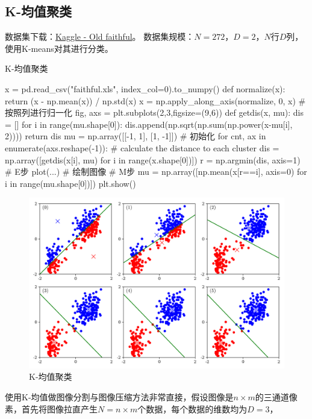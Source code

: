 \documentclass[12pt, a4paper, oneside]{ctexart}
\begin{document}
\subsection{K-均值聚类}
数据集下载：\href{https://www.kaggle.com/code/niteshhalai/old-faithful-data-visualisation-and-modelling/input}{Kaggle - Old faithful}。
数据集规模：$N = 272$，$D = 2$，$N$行$D$列，使用K-means对其进行分类。
\begin{algorithm}
    \caption{K-均值聚类}
    \begin{pythoncode}
x = pd.read_csv("faithful.xls", index_col=0).to_numpy()
def normalize(x): return (x - np.mean(x)) / np.std(x)
x = np.apply_along_axis(normalize, 0, x)  # 按照列进行归一化
fig, axs = plt.subplots(2,3,figsize=(9,6))
def getdis(x, mu):
    dis = []
    for i in range(mu.shape[0]):
        dis.append(np.sqrt(np.sum(np.power(x-mu[i], 2))))
    return dis
mu = np.array([[-1, 1], [1, -1]])  # 初始化
for cnt, ax in enumerate(axs.reshape(-1)):
    # calculate the distance to each cluster
    dis = np.array([getdis(x[i], mu) for i in range(x.shape[0])])
    r = np.argmin(dis, axis=1)  # E步
    plot(...)  # 绘制图像
    # M步
    mu = np.array([np.mean(x[r==i], axis=0) for i in range(mu.shape[0])])
plt.show()
    \end{pythoncode}
\end{algorithm}
\begin{figure}[H]
    \centering
    \vspace{-1.0cm}
    \includegraphics[scale=0.7]{./code/figures/faithful/Kmeans.png}
    \caption{K-均值聚类}
\end{figure}
使用K-均值做图像分割与图像压缩方法非常直接，假设图像是$n\times m$的三通道像素，首先将图像拉直产生$N=n\times m$个数据，每个数据的维数均为$D=3$，
\end{document}
